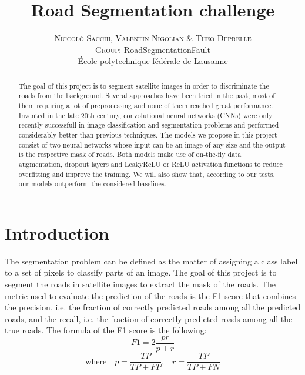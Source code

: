 \documentclass[10pt,conference,compsocconf]{IEEEtran}
\begin{document}
\pretitle{\begin{center}\Huge\bfseries} %
\posttitle{\end{center}} %
\title{Road Segmentation challenge}

\author{
	\textsc{Niccol\`{o} Sacchi, Valentin Nigolian \& Theo Deprelle}
	\normalsize{} \\
	\textsc{Group:}
	\normalsize{RoadSegmentationFault}\\
	\normalsize \'{E}cole polytechnique f\'{e}d\'{e}rale de Lausanne
}

\maketitle

\begin{abstract}
  The goal of this project is to segment satellite images in order to discriminate the roads from the background. Several approaches have been tried in the past, most of them requiring a lot of preprocessing and none of them reached great performance. Invented in the late 20th century, convolutional neural networks (CNNs)  were only recently successfull in image-classification and segmentation problems and performed considerably better than previous techniques.
  The models we propose in this project consist of two neural networks whose input can be an image of any size and the output is the respective mask of roads. Both models make use of on-the-fly data augmentation, dropout layers and LeakyReLU or ReLU activation functions to reduce overfitting and improve the training. We will also show that, according to our tests, our models outperform the considered baselines.
\end{abstract}

\section{Introduction}
The segmentation problem can be defined as the matter of assigning a class label to a set of pixels to classify parts of an image.
The goal of this project is to segment the roads in satellite images to extract the mask of the roads. The metric used to evaluate the prediction of the roads is the F1 score that combines the precision, i.e. the fraction of correctly predicted roads among all the predicted roads, and the recall, i.e. the fraction of correctly predicted roads among all the true roads. The formula of the F1 score is the following:
$$F1=2\frac{pr}{p+r}$$ $$\textrm{where} \quad p=\frac{TP}{TP+FP} \textrm{,} \quad r=\frac{TP}{TP+FN}$$
\end{document}
